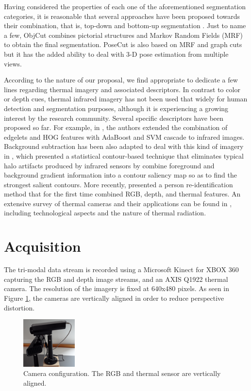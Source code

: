 \documentclass[10pt,twocolumn,letterpaper]{article}
\begin{document}
Having considered the properties of each one of the aforementioned segmentation categories, it is reasonable that several approaches have been proposed towards their combination, that is, top-down and bottom-up segmentation \cite{lin2007interactive, mori2004recovering, ladicky2010and, levin2006learning}. Just to name a few, ObjCut \cite{kumar2005obj} combines pictorial structures and Markov Random Fields (MRF) to obtain the final segmentation. PoseCut \cite{bray2006posecut} is also based on MRF and graph cuts but it has the added ability to deal with 3-D pose estimation from multiple views.
 
According to the nature of our proposal, we find appropriate to dedicate a few lines regarding thermal imagery and associated descriptors. In contrast to color or depth cues, thermal infrared imagery has not been used that widely for human detection and segmentation purposes, although it is experiencing a growing interest by the research community. Several specific descriptors have been proposed so far. For example, in \cite{zhang2007pedestrian}, the authors extended the combination of edgelets and HOG features with AdaBoost and SVM cascade to infrared images. Background subtraction has been also adapted to deal with this kind of imagery in \cite{davis2004robust}, which presented a statistical contour-based technique that eliminates typical halo artifacts produced by infrared sensors by combine foreground and background gradient information into a contour saliency map so as to find the strongest salient contours. More recently, \cite{mogelmosetri} presented a person re-identification method that for the first time combined RGB, depth, and thermal features. An extensive survey of thermal cameras and their applications can be found in \cite{gade2014thermal}, including technological aspects and the nature of thermal radiation. 
 
\section{Acquisition}
\label{sec:setup}
The tri-modal data stream is recorded using a Microsoft Kinect for XBOX 360 capturing the RGB and depth image streams, and an AXIS Q1922 thermal camera. The resolution of the imagery is fixed at 640x480 pixels. As seen in Figure \ref{fig:camerasetup}, the cameras are vertically aligned in order to reduce perspective distortion. 

\begin{figure}[htpb]
	\centering
		\includegraphics[width=0.25\textwidth]{pictures/camerasetup.jpg}
	\caption{Camera configuration. The RGB and thermal sensor are vertically aligned.}
	\label{fig:camerasetup}
\end{figure}
\end{document}
